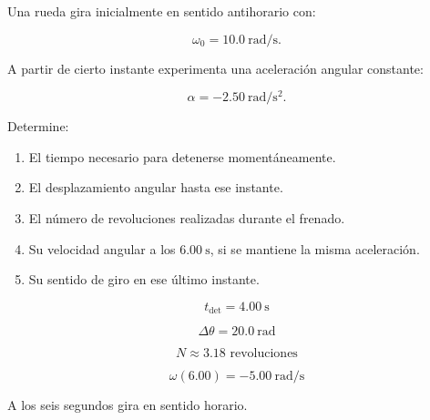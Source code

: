 \begin{ejercicio}
Una rueda gira inicialmente en sentido antihorario con:

\[
\omega_0=\SI{10.0}{\radian\per\second}.
\]

A partir de cierto instante experimenta una aceleración
angular constante:

\[
\alpha=-\SI{2.50}{\radian\per\second\squared}.
\]

Determine:

\begin{enumerate}[label=\alph*)]
    \item El tiempo necesario para detenerse momentáneamente.
    \item El desplazamiento angular hasta ese instante.
    \item El número de revoluciones realizadas durante el frenado.
    \item Su velocidad angular a los \(\SI{6.00}{\second}\),
    si se mantiene la misma aceleración.
    \item Su sentido de giro en ese último instante.
\end{enumerate}
\end{ejercicio}

\begin{respuesta}
\[
\boxed{t_{\mathrm{det}}=\SI{4.00}{\second}}
\]

\[
\boxed{\Delta\theta=\SI{20.0}{\radian}}
\]

\[
\boxed{N\approx3.18\text{ revoluciones}}
\]

\[
\boxed{\omega(6.00)=-\SI{5.00}{\radian\per\second}}
\]

A los seis segundos gira en sentido horario.
\end{respuesta}

